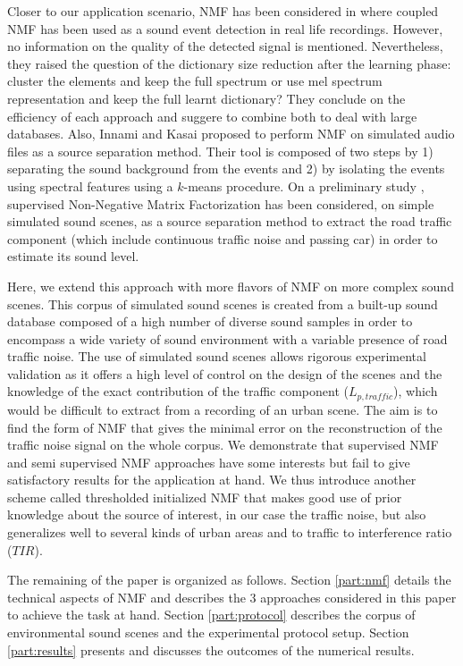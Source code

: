 \documentclass[twocolumn]{svjour3}          %
\begin{document}
Closer to our application scenario, NMF has been considered in \cite{mesaros_sound_2015} where coupled NMF has been used as a sound event detection in real life recordings. However, no information on the quality of the detected signal is mentioned. Nevertheless, they raised the question of the dictionary size reduction after the learning phase: cluster the elements and keep the full spectrum or use mel spectrum representation and keep the full learnt dictionary? They conclude on the efficiency of each approach and suggere to combine both to deal with large databases. Also, Innami and Kasai \cite{satoshi_innami_nmf-based_2012} proposed to perform NMF on simulated audio files as a source separation method. Their tool is composed of two steps by 1) separating the sound background from the events and 2) by isolating the events using spectral features using a $k$-means procedure. 
On a preliminary study \cite{gloaguen2016estimating}, supervised Non-Negative Matrix Factorization has been considered, on simple simulated sound scenes, as a source separation method to extract the road traffic component (which include continuous traffic noise and passing car) in order to estimate its sound level. 

Here, we extend this approach with more flavors of NMF on more complex sound scenes. This corpus of simulated sound scenes is created from a built-up sound database composed of a high number of diverse sound samples in order to encompass a wide variety of sound environment with a variable presence of road traffic noise. The use of simulated sound scenes allows rigorous experimental validation as it offers a high level of control on the design of the scenes and the knowledge of the exact contribution of the traffic component ($L_{p,traffic}$), which would be difficult to extract from a recording of an urban scene. 
The aim is to find the form of NMF that gives the minimal error on the reconstruction of the traffic noise signal on the whole corpus.
We demonstrate that supervised NMF and semi supervised NMF approaches have some interests but fail to give satisfactory results for the application at hand. We thus introduce another scheme called thresholded initialized NMF that makes good use of prior knowledge about the source of interest, in our case the traffic noise, but also generalizes well to several kinds of urban areas and to traffic to interference ratio ($TIR$).

The remaining of the paper is organized as follows. Section \ref{part:nmf} details the technical aspects of NMF and describes the 3 approaches considered in this paper to achieve the task at hand. Section \ref{part:protocol} describes the corpus of environmental sound scenes and the experimental protocol setup. Section \ref{part:results} presents and discusses the outcomes of the numerical results.
\end{document}

